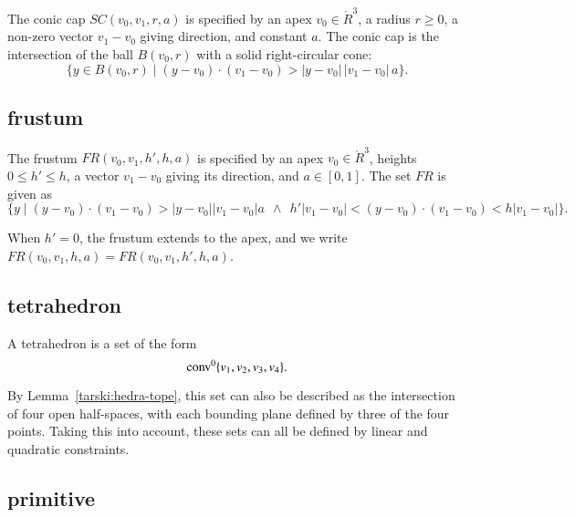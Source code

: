 
\begin{definition}
The conic cap $SC(v_0,v_1,r,a)$ is specified by an apex
$v_0\in\ring{R}^3$, a radius $r\ge0$, a non-zero vector $v_1-v_0$ giving
direction, and constant $a$.  The conic cap is the intersection of
the ball $B(v_0,r)$ with a solid right-circular cone:
    $$
    \{y \in B(v_0,r) \mid (y-v_0)\cdot (v_1-v_0) > |y-v_0|\, |v_1-v_0|\, a\}.
    $$
\end{definition}

\subsection{frustum}

\begin{definition} The frustum
$FR(v_0,v_1,h',h,a)$ is specified by an apex $v_0\in\ring{R}^3$, heights
$0\le h'\le h$, a vector $v_1-v_0$ giving its direction, and
$a\in[0,1]$. The set $FR$ is given as
    $$
    \{ y \mid (y-v_0)\cdot (v_1-v_0) > |y-v_0| |v_1-v_0|  a \ \ \land\ \
       h'|v_1-v_0| < (y-v_0) \cdot (v_1-v_0) < h|v_1-v_0| \}.
    $$
\end{definition}

When $h'=0$, the frustum extends to the apex, and
we write $FR(v_0,v_1,h,a)=FR(v_0,v_1,h',h,a)$.

\subsection{tetrahedron}

\begin{definition} A tetrahedron is a set of the form
$${\operatorname{conv}}^0\{v_1,v_2,v_3,v_4\}.$$
\end{definition}

By Lemma~\ref{tarski:hedra-tope}, this set can also be described
as the intersection of four open half-spaces, with each bounding
plane defined by three of the four points.
Taking this into account,
these sets can all be defined by linear and quadratic
constraints.

\subsection{primitive}

